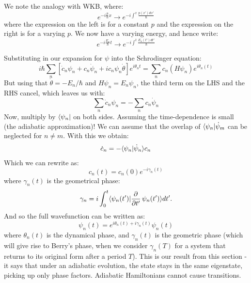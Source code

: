 We note the analogy with WKB, where:
\begin{equation}
    e^{-i\frac{p}{\hbar}x} \to e^{-i\int^x \frac{p(x')dx'}{\hbar}}
\end{equation}
where the expression on the left is for a constant $p$ and the expression on the right is for a varying $p$. We now have a varying energy, and hence write:
\begin{equation}
    e^{-i\frac{E_n}{\hbar}t} \to e^{-i\int^t \frac{E_n(t')dt'}{\hbar}}
\end{equation}

Substituting in our expansion for $\psi$ into the Schrodinger equation:
\begin{equation}
    i\hbar \sum_n \left[\dot{c}_n \psi_n + c_n \dot{\psi}_n + ic_n \psi_n \dot{\theta}\right]e^{i\theta_n t} = \sum_n c_n(H\psi_n)e^{i\theta_n(t)}
\end{equation}
But using that $\dot{\theta} = -E_n/\hbar$ and $H\psi_n = E_n\psi_n$, the third term on the LHS and the RHS cancel, which leaves us with:
\begin{equation}
    \sum_n \dot{c}_n \psi_n = -\sum_n c_n \dot{\psi}_n
\end{equation}
Now, multiply by $\langle \psi_n \rvert$ on both sides. Assuming the time-dependence is small (the adiabatic approximation)! We can assume that the overlap of $\langle \psi_n \rvert{\dot{\psi}_m}$ can be neglected for $n \neq m$. With this we obtain:
\begin{equation}
    \dot{c}_n = -\langle \psi_n \lvert \dot{\psi}_n \rangle c_n
\end{equation}
Which we can rewrite as:
\begin{equation}
    c_n(t) = c_n(0) e^{-i\gamma_n(t)}
\end{equation}
where $\gamma_n(t)$ is the geometrical phase:
\begin{equation}
    \gamma_n = i \int_0^t \braket{\psi_n(t')}{\dpd{}{t'}\psi_n(t')}dt'.
\end{equation}
And so the full wavefunction can be written as:
\begin{equation}
    \psi_n(t) = e^{i\theta_n(t) + i\gamma_n(t)}\psi_n(t)
\end{equation}
where $\theta_n(t)$ is the dynamical phase, and $\gamma_n(t)$ is the geometric phase (which will give rise to Berry's phase, when we consider $\gamma_n(T)$ for a system that returns to its original form after a period $T$). This is our result from this section - it says that under an adiabatic evolution, the state stays in the same eigenstate, picking up only phase factors. Adiabatic Hamiltonians cannot cause transitions.

